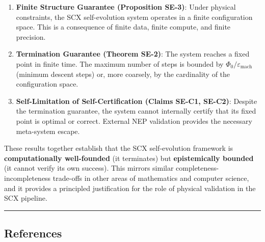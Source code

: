 \documentclass[
  12pt,
]{ctexart}
\begin{document}
\begin{enumerate}
\def\labelenumi{\arabic{enumi}.}
\item
  \textbf{Finite Structure Guarantee (Proposition SE-3)}: Under physical
  constraints, the SCX self-evolution system operates in a finite
  configuration space. This is a consequence of finite data, finite
  compute, and finite precision.
\item
  \textbf{Termination Guarantee (Theorem SE-2)}: The system reaches a
  fixed point in finite time. The maximum number of steps is bounded by
  \(\Phi_0/\varepsilon_{\text{mach}}\) (minimum descent steps) or, more
  coarsely, by the cardinality of the configuration space.
\item
  \textbf{Self-Limitation of Self-Certification (Claims SE-C1, SE-C2)}:
  Despite the termination guarantee, the system cannot internally
  certify that its fixed point is optimal or correct. External NEP
  validation provides the necessary meta-system escape.
\end{enumerate}

These results together establish that the SCX self-evolution framework
is \textbf{computationally well-founded} (it terminates) but
\textbf{epistemically bounded} (it cannot verify its own success). This
mirrors similar completeness-incompleteness trade-offs in other areas of
mathematics and computer science, and it provides a principled
justification for the role of physical validation in the SCX pipeline.

\begin{center}\rule{0.5\linewidth}{0.5pt}\end{center}

\subsection{References}\label{references}
\end{document}
